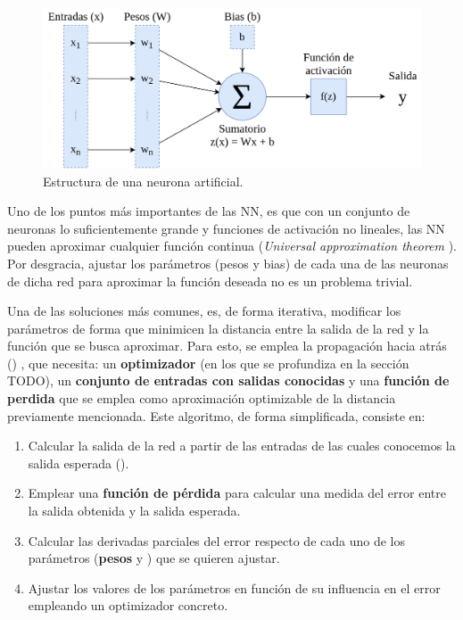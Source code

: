 \begin{figure}[H]
\centering
\includegraphics[width=.75\linewidth]{imagenes/neurona.png} 
\captionsetup{width=.5\linewidth}
\caption{Estructura de una neurona artificial.}
\label{fig:neurona}
\end{figure}

Uno de los puntos más importantes de las NN, es que con un conjunto de neuronas lo suficientemente grande y funciones de activación no lineales, las NN pueden aproximar cualquier función continua (\textit{Universal approximation theorem} \cite{}). Por desgracia, ajustar los parámetros (pesos y bias) de cada una de las neuronas de dicha red para aproximar la función deseada no es un problema trivial. 

Una de las soluciones más comunes, es, de forma iterativa, modificar los parámetros de forma que minimicen la distancia entre la salida de la red y la función que se busca aproximar. Para esto, se emplea la propagación hacia atrás () \cite{}, que necesita: un \textbf{optimizador} (en los que se profundiza en la sección TODO), un \textbf{conjunto de entradas con salidas conocidas} y una \textbf{función de perdida} que se emplea como aproximación optimizable de la distancia previamente mencionada. Este algoritmo, de forma simplificada, consiste en:

\begin{enumerate}
\item Calcular la salida de la red a partir de las entradas de las cuales conocemos la salida esperada ().
\item Emplear una \textbf{función de pérdida} para calcular una medida del error entre la salida obtenida y la salida esperada.
\item Calcular las derivadas parciales del error respecto de cada uno de los parámetros (\textbf{pesos} y ) que se quieren ajustar.
\item Ajustar los valores de los parámetros en función de su influencia en el error empleando un optimizador concreto.
\end{enumerate}


